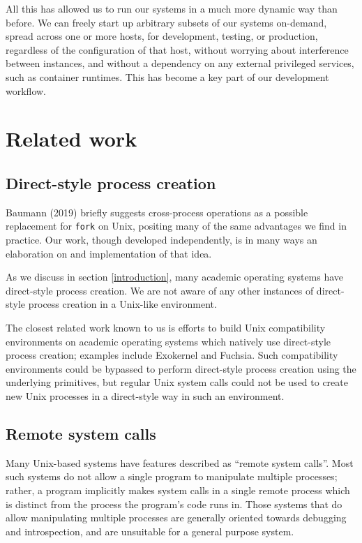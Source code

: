 \documentclass[letterpaper,twocolumn,10pt]{article}
\begin{document}
All this has allowed us to run our systems in a much more dynamic way than before.
We can freely start up arbitrary subsets of our systems on-demand,
spread across one or more hosts,
for development, testing, or production,
regardless of the configuration of that host,
without worrying about interference between instances,
and without a dependency on any external privileged services,
such as container runtimes.
This has become a key part of our development workflow.
\section{Related work}\label{related_work}
\subsection{Direct-style process creation}
Baumann (2019) briefly suggests cross-process operations as a possible replacement for \texttt{fork} on Unix,
positing many of the same advantages we find in practice\cite{forkroad}.
Our work, though developed independently,
is in many ways an elaboration on and implementation of that idea.

As we discuss in section \ref{introduction},
many academic operating systems have direct-style process creation.
We are not aware of any other instances of direct-style process creation in a Unix-like environment.

The closest related work known to us
is efforts to build Unix compatibility environments
on academic operating systems which natively use direct-style process creation;
examples include Exokernel and Fuchsia\cite{exokernel}\cite{fuchsia_libc}.
Such compatibility environments could be bypassed to perform direct-style process creation
using the underlying primitives,
but regular Unix system calls could not be used to create new Unix processes in a direct-style way
in such an environment.
\subsection{Remote system calls}\label{related}
Many Unix-based systems have features described as ``remote system calls''.
Most such systems do not allow a single program to manipulate multiple processes;
rather, a program implicitly makes system calls in a single remote process
which is distinct from the process the program's code runs in.
Those systems that do allow manipulating multiple processes
are generally oriented towards debugging and introspection,
and are unsuitable for a general purpose system.
\end{document}
